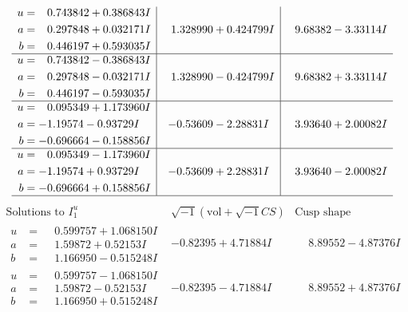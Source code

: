 \documentclass[1p]{elsarticle_modified}
\theoremstyle{definition}
\newcommand{\I}{\sqrt{-1}}
\begin{document}
$$\begin{array}{c|c|c}
\begin{aligned}
u &= \phantom{-}0.743842 + 0.386843 I \\
a &= \phantom{-}0.297848 + 0.032171 I \\
b &= \phantom{-}0.446197 + 0.593035 I\end{aligned}
 & \phantom{-}1.328990 + 0.424799 I & \phantom{-}9.68382 - 3.33114 I \\ \hline\begin{aligned}
u &= \phantom{-}0.743842 - 0.386843 I \\
a &= \phantom{-}0.297848 - 0.032171 I \\
b &= \phantom{-}0.446197 - 0.593035 I\end{aligned}
 & \phantom{-}1.328990 - 0.424799 I & \phantom{-}9.68382 + 3.33114 I \\ \hline\begin{aligned}
u &= \phantom{-}0.095349 + 1.173960 I \\
a &= -1.19574 - 0.93729 I \\
b &= -0.696664 - 0.158856 I\end{aligned}
 & -0.53609 - 2.28831 I & \phantom{-}3.93640 + 2.00082 I \\ \hline\begin{aligned}
u &= \phantom{-}0.095349 - 1.173960 I \\
a &= -1.19574 + 0.93729 I \\
b &= -0.696664 + 0.158856 I\end{aligned}
 & -0.53609 + 2.28831 I & \phantom{-}3.93640 - 2.00082 I\\
 \hline 
 \end{array}$$\newpage$$\begin{array}{c|c|c}  
\text{Solutions to }I^u_{1}& \I (\text{vol} + \sqrt{-1}CS) & \text{Cusp shape}\\
 \hline 
\begin{aligned}
u &= \phantom{-}0.599757 + 1.068150 I \\
a &= \phantom{-}1.59872 + 0.52153 I \\
b &= \phantom{-}1.166950 - 0.515248 I\end{aligned}
 & -0.82395 + 4.71884 I & \phantom{-}8.89552 - 4.87376 I \\ \hline\begin{aligned}
u &= \phantom{-}0.599757 - 1.068150 I \\
a &= \phantom{-}1.59872 - 0.52153 I \\
b &= \phantom{-}1.166950 + 0.515248 I\end{aligned}
 & -0.82395 - 4.71884 I & \phantom{-}8.89552 + 4.87376 I \\ \hline\begin{aligned}

\end{aligned}
\end{array}$$
\end{document}
